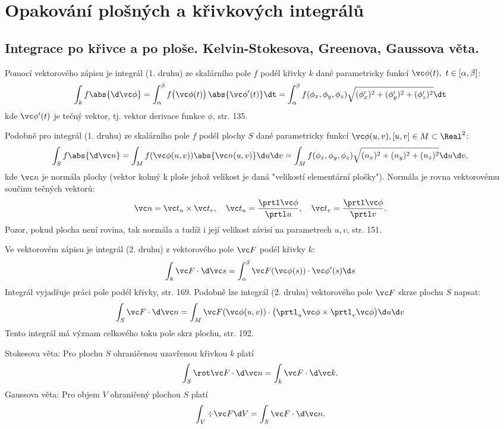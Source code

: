 \section{Opakování plošných a křivkových integrálů}
\subsection{Integrace po křivce a po ploše. Kelvin-Stokesova, Greenova, Gaussova věta.}
Pomocí vektorového zápisu je integrál (1. druhu) ze skalárního pole $f$ podél křivky $k$ dané parametricky funkcí $\vc \phi(t),\ t\in[\alpha,\beta]$:
\[
   \int_k f \abs{\d \vc \phi} = \int_{\alpha}^\beta f\big(\vc \phi(t)\big)\, \abs{\vc \phi'(t)} \dt=
   \int_\alpha^\beta f(\phi_x,\phi_y,\phi_z) \sqrt{ (\phi_x')^2+(\phi_y')^2+(\phi_z')^2} \dt
\]
kde $\vc \phi'(t)$ je tečný vektor, tj. vektor derivace funkce $\phi$, \cite{CVUT} str. 135.

Podobně pro integrál (1. druhu) ze skalárního pole $f$ podél plochy $S$ dané parametricky funkcí
$\vc \phi(u,v), [u,v]\in M\subset \Real^2$:
\[
   \int_S f \abs{\d \vc n} = \int_M f(\vc \phi(u,v)) \abs{\vc n(u,v)} \d u\d v=
   \int_M f(\phi_x,\phi_y,\phi_z) \sqrt{ (n_x)^2 + (n_y)^2 + (n_z)^2} \d u\d v,
\]
kde $\vc n$ je normála plochy (vektor kolmý k ploše jehož velikost je daná "velikostí elementární plošky"). Normála je rovna vektorovému součinu tečných vektorů:
\[
   \vc n= \vc t_u \times \vc t_v,\quad \vc t_u = \frac{\prtl \vc \phi}{\prtl u},\quad \vc t_v=\frac{\prtl \vc \phi}{\prtl v}.
\]
Pozor, pokud plocha není rovina, tak normála a tudíž i její velikost závisí na parametrech $u, v$, \cite{CVUT} str. 151.

Ve vektorovém zápisu je integrál (2. druhu) z vektorového pole $\vc F$ podél křivky $k$:
\[
 \int_k \vc F \cdot \d \vc s = \int_\alpha^\beta \vc F( \vc \phi(s) ) \cdot \vc \phi'(s) \d s
\]
Integrál vyjadřuje práci pole podél křivky, \cite{CVUT} str. 169.
Podobně lze integrál (2. druhu) vektorového pole $\vc F$ skrze plochu $S$ napsat:
\[
  \int_S \vc F\cdot \d \vc n = \int_M \vc F( \vc \phi(u,v) ) \cdot \big( \prtl_u \vc \phi \times \prtl_v \vc \phi\big) \d u\d v
\]
Tento integrál má význam celkového toku pole skrz plochu, \cite{CVUT} str. 192.

Stokesova věta: Pro plochu $S$ ohraničenou uzavřenou křivkou $k$ platí
\[
        \int_S \rot \vc F \cdot \d \vc n = \int_k \vc F\cdot \d \vc k.
\]
Gaussova věta: Pro objem $V$ ohraničený plochou $S$ platí
\[
        \int_V \div \vc F \d V = \int_S \vc F\cdot \d \vc n.
\]

